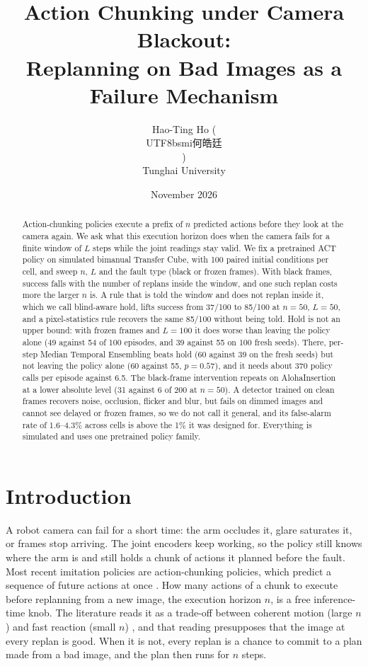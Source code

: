 \documentclass[11pt]{article}
\title{Action Chunking under Camera Blackout:\\
Replanning on Bad Images as a Failure Mechanism}
\author{Hao-Ting Ho (\begin{CJK}{UTF8}{bsmi}何皓廷\end{CJK})\\
{\small Tunghai University}}
\date{November 2026}
\begin{document}
\maketitle

\begin{abstract}
Action-chunking policies execute a prefix of $n$ predicted actions before they look at the camera again. We ask what this execution horizon does when the camera fails for a finite window of $L$ steps while the joint readings stay valid. We fix a pretrained ACT policy on simulated bimanual Transfer Cube, with 100 paired initial conditions per cell, and sweep $n$, $L$ and the fault type (black or frozen frames). With black frames, success falls with the number of replans inside the window, and one such replan costs more the larger $n$ is. A rule that is told the window and does not replan inside it, which we call blind-aware hold, lifts success from 37/100 to 85/100 at $n{=}50$, $L{=}50$, and a pixel-statistics rule recovers the same 85/100 without being told. Hold is not an upper bound: with frozen frames and $L{=}100$ it does worse than leaving the policy alone (49 against 54 of 100 episodes, and 39 against 55 on 100 fresh seeds). There, per-step Median Temporal Ensembling beats hold (60 against 39 on the fresh seeds) but not leaving the policy alone (60 against 55, $p=0.57$), and it needs about 370 policy calls per episode against 6.5. The black-frame intervention repeats on AlohaInsertion at a lower absolute level (31 against 6 of 200 at $n{=}50$). A detector trained on clean frames recovers noise, occlusion, flicker and blur, but fails on dimmed images and cannot see delayed or frozen frames, so we do not call it general, and its false-alarm rate of 1.6--4.3\% across cells is above the 1\% it was designed for. Everything is simulated and uses one pretrained policy family.
\end{abstract}

\section{Introduction}
\label{sec:intro}

A robot camera can fail for a short time: the arm occludes it, glare saturates it, or frames stop arriving. The joint encoders keep working, so the policy still knows where the arm is and still holds a chunk of actions it planned before the fault. Most recent imitation policies are action-chunking policies, which predict a sequence of future actions at once \cite{zhao2023act,chi2023dp,black2025pi0}. How many actions of a chunk to execute before replanning from a new image, the execution horizon $n$, is a free inference-time knob. The literature reads it as a trade-off between coherent motion (large $n$) and fast reaction (small $n$) \cite{chi2023dp,liu2025bid,zeng2026openloop}, and that reading presupposes that the image at every replan is good. When it is not, every replan is a chance to commit to a plan made from a bad image, and the plan then runs for $n$ steps.
\end{document}

